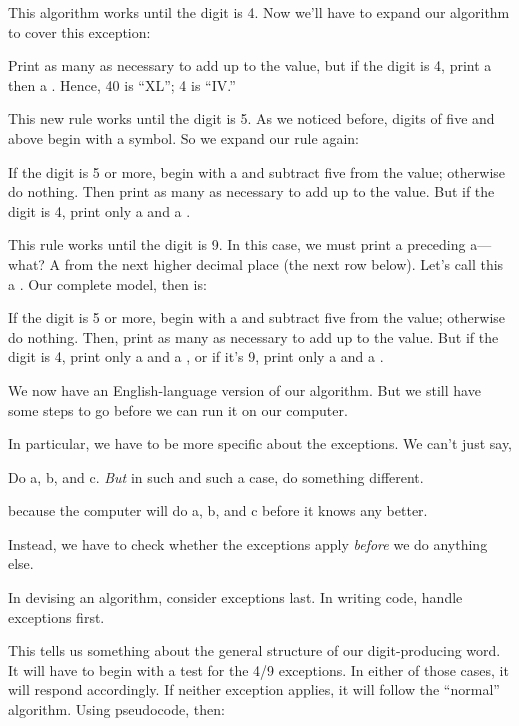 This algorithm works until the digit is 4. Now we'll have to expand
our algorithm to cover this exception:

\begin{tfquot}
Print as many  as necessary to add up to the value, but if
the digit is 4, print a  then a .
Hence, 40 is ``XL''; 4 is ``IV.''
\end{tfquot}
This new rule works until the digit is 5. As we noticed before, digits of
five and above begin with a  symbol. So we expand our rule
again:

\begin{tfquot}
If the digit is 5 or more, begin with a  and subtract five
from the value; otherwise do nothing. Then print as many  as
necessary to add up to the value. But if the digit is 4, print only a
 and a .
\end{tfquot}
This rule works until the digit is 9. In this case, we must print a
 preceding a---what? A  from the next higher
decimal place (the next row below). Let's call this a . Our
complete model, then is:

\begin{tfquot}
If the digit is 5 or more, begin with a  and subtract five
from the value; otherwise do nothing. Then, print as many  as
necessary to add up to the value. But if the digit is 4, print only a
 and a , or if it's 9, print only a 
and a .
\end{tfquot}
%
We now have an English-language version of our algorithm.  But we still
have some steps to go before we can run it on our computer.

In particular, we have to be more specific about the exceptions. We
can't just say,

\begin{tfquot}
Do a, b, and c. \emph{But} in such and such a case, do something different.
\end{tfquot}
because the computer will do a, b, and c before it knows any better.
\medbreak

Instead, we have to check whether the exceptions apply \emph{before} we
do anything else.

\begin{tip}
In devising an algorithm, consider exceptions last. In writing code, handle
exceptions first.
\end{tip}
This tells us something about the general structure of our digit-producing
word. It will have to begin with a test for the 4/9 exceptions. In
either of those cases, it will respond accordingly. If neither exception
applies, it will follow the ``normal'' algorithm. Using pseudocode, then:

